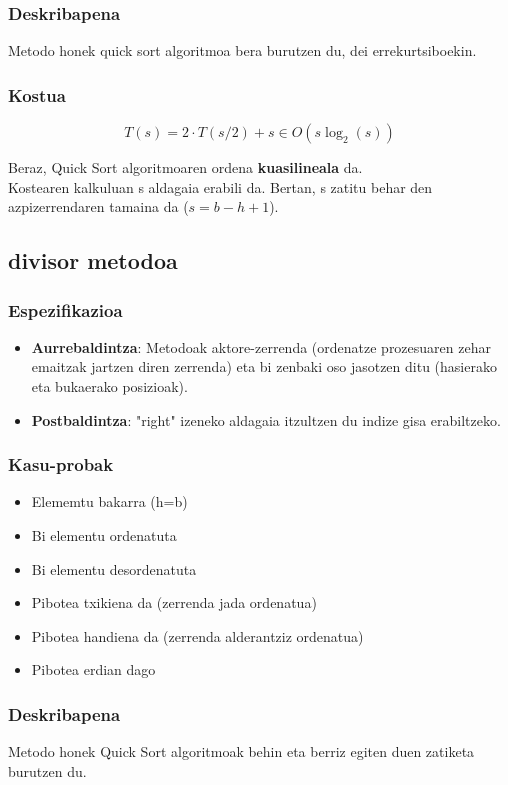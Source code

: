 \documentclass[a4paper,10pt]{report}
\begin{document}
		\subsubsection*{Deskribapena}
			Metodo honek quick sort algoritmoa bera burutzen du, dei errekurtsiboekin.
		\subsubsection*{Kostua}
			\[
				T(s) = 2·T(s/2) + s \in O(s\log_{2}(s))
			\]
			
			Beraz, Quick Sort algoritmoaren ordena \textbf{kuasilineala} da.\\
			Kostearen kalkuluan s aldagaia erabili da. Bertan, s zatitu behar den azpizerrendaren tamaina da ($s = b - h + 1$).
	
	\subsection{divisor metodoa}
		\subsubsection*{Espezifikazioa}
			\begin{itemize}
				\item \textbf{Aurrebaldintza}: Metodoak aktore-zerrenda (ordenatze prozesuaren zehar emaitzak jartzen diren zerrenda) eta bi zenbaki oso jasotzen ditu (hasierako eta bukaerako posizioak).
				\item \textbf{Postbaldintza}: "right" izeneko aldagaia itzultzen du indize gisa erabiltzeko.
			\end{itemize}
		\subsubsection*{Kasu-probak}
		\begin{itemize}
			\item Elememtu bakarra (h=b)
			\item Bi elementu ordenatuta
			\item Bi elementu desordenatuta
			\item Pibotea txikiena da (zerrenda jada ordenatua)
			\item Pibotea handiena da (zerrenda alderantziz ordenatua)
			\item Pibotea erdian dago
		\end{itemize}
		\subsubsection*{Deskribapena}
			Metodo honek Quick Sort algoritmoak behin eta berriz egiten duen zatiketa burutzen du.
\end{document}
